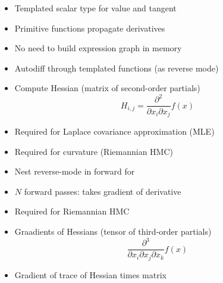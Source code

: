 \documentclass[10pt]{report}
\begin{document}
%
\begin{itemize}
\item Templated scalar type for value and tangent
\item Primitive functions propagate derivatives
\item No need to build expression graph in memory
\item Autodiff through templated functions (as reverse mode)
\end{itemize}

%
\begin{itemize}
\item Compute Hessian (matrix of second-order partials)  
\[
H_{i,j} = \frac{\partial^2}{\partial x_i \partial x_j} f(x)
\]
\item Required for Laplace covariance approximation (MLE)
\item Required for curvature (Riemannian HMC)
\item Nest reverse-mode in forward for  
\item $N$ forward passes: takes gradient of derivative
\end{itemize}


%
\begin{itemize}
\item Required for Riemannian HMC
\item Graadients of Hessians (tensor of third-order partials)
\[
\frac{\partial^3}{\partial x_i \partial x_j \partial x_k} f(x)
\]
\vspace*{-12pt}
\end{itemize}


%
\begin{itemize}
\item Gradient of trace of Hessian times matrix
\end{itemize}
\end{document}
